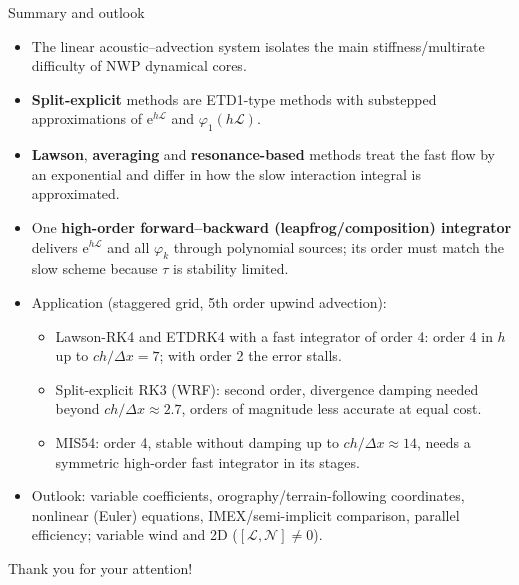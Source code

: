 \documentclass[aspectratio=169,10pt]{beamer}
\newcommand{\ee}{\mathrm{e}}
\newcommand{\LL}{\mathcal{L}}   %
\newcommand{\NN}{\mathcal{N}}   %
\newcommand{\ph}{\varphi}
\begin{document}
\begin{frame}{Summary and outlook}
  \small
  \begin{itemize}
    \item The linear acoustic--advection system isolates the main stiffness/multirate difficulty of NWP dynamical cores.
    \item \textbf{Split-explicit} methods are ETD1-type methods with substepped approximations of $\ee^{h\LL}$ and $\ph_1(h\LL)$.
    \item \textbf{Lawson}, \textbf{averaging} and \textbf{resonance-based} methods treat the fast flow by an exponential and differ in how the
    slow interaction integral is approximated.
    \item One \textbf{high-order forward--backward (leapfrog/composition) integrator} delivers $\ee^{h\LL}$ and all $\ph_k$ through polynomial sources;
    its order must match the slow scheme because $\tau$ is stability limited.
    \item Application (staggered grid, 5th order upwind advection):
    \begin{itemize}\small
      \item Lawson-RK4 and ETDRK4 with a fast integrator of order 4: order 4 in $h$ up to $ch/\Delta x=7$; with order 2 the error stalls.
      \item Split-explicit RK3 (WRF): second order, divergence damping needed beyond $ch/\Delta x\approx2.7$, orders of magnitude less accurate at equal cost.
      \item MIS54: order 4, stable without damping up to $ch/\Delta x\approx14$, needs a symmetric high-order fast integrator in its stages.
    \end{itemize}
    \item Outlook: variable coefficients, orography/terrain-following coordinates, nonlinear (Euler) equations,
    IMEX/semi-implicit comparison, parallel efficiency; variable wind and 2D ($[\LL,\NN]\neq0$).
  \end{itemize}
  \vspace{0.5em}
  \centering\Large Thank you for your attention!
\end{frame}
\end{document}
